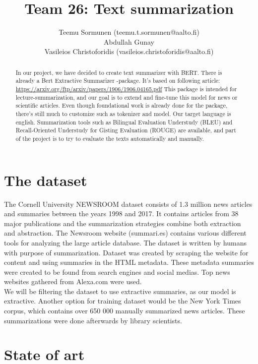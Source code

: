 \documentclass{article}
\title{Team 26: Text summarization}
\author{Teemu Sormunen (teemu.t.sormunen@aalto.fi)\\
	Abdullah Gunay\\
	Vasileios Christoforidis (vasileios.christoforidis@aalto.fi)\\
}
\begin{document}
	
\maketitle

\begin{abstract}
\noindent
	In our project, we have decided to create text summarizer with BERT. 
	There is already a Bert Extractive Summarizer -package. It's based on following article: \href{https://arxiv.org/ftp/arxiv/papers/1906/1906.04165.pdf}{https://arxiv.org/ftp/arxiv/papers/1906/1906.04165.pdf}
	This package is intended for lecture-summarization, and our goal is to extend and fine-tune this model for news or scientific articles.
	Even though foundational work is already done for the package, there's still much to customize such as tokenizer and model. 
	Our target language is english. Summarization tools such as Bilingual Evaluation Understudy (BLEU) and Recall-Oriented Understudy for Gisting Evaluation (ROUGE) are available, and part of the project is to try to evaluate the texts automatically and manually.	
\end{abstract}

\clearpage
\section{The dataset}

The Cornell University NEWSROOM dataset \cite{dataset} consists of 1.3 million news articles and summaries between the years 1998 and 2017. It contains articles from 38 major publications and the summarization strategies combine both extraction and abstraction. The Newsroom website (summari.es) contains various different tools for analyzing the large article database. The dataset is written by humans with purpose of summarization. Dataset was created by scraping the website for content and using summaries in the HTML metadata. These metadata summaries were created to be found from search engines and social medias. Top news websites gathered from Alexa.com were used. \\

\noindent
We will be filtering the dataset \cite{dataset} to use extractive summaries, as our model is extractive. Another option for training dataset would be the New York Times corpus, which contains over 650 000 manually summarized news articles. These summarizations were done afterwards by library scientists. \cite{ny_dataset} 


\section{State of art }
\end{document}
